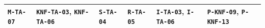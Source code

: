 \begin{longtable}{|p{}|p{}|p{}|p{}|p{}|p{}|}
	\texttt{M-TA-07} & \texttt{KNF-TA-03}, \texttt{KNF-TA-06}                                                                              & \texttt{S-TA-04}                   & \texttt{R-TA-05}                                     & \texttt{I-TA-03}, \texttt{I-TA-06}                                     & \texttt{P-KNF-09}, \texttt{P-KNF-13}                                                                                                                                 \\ \hline
\end{longtable}
\endgroup
